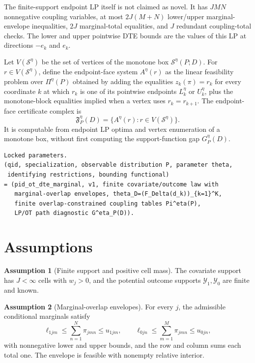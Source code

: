\documentclass[11pt]{article}
\theoremstyle{definition}
\newtheorem{assumption}{Assumption}
\theoremstyle{plain}
\theoremstyle{remark}
\begin{document}
The finite-support endpoint LP itself is not claimed as novel.  It has \(JMN\)
nonnegative coupling variables, at most \(2J(M+N)\) lower/upper marginal-envelope
inequalities, \(2J\) marginal-total equalities, and \(J\) redundant
coupling-total checks.  The lower and upper pointwise DTE bounds are the values
of this LP at directions \(-e_k\) and \(e_k\).

Let \(V(\mathcal S^\eta)\) be the set of vertices of the monotone box
\(\mathcal S^\eta(P;D)\).  For \(r\in V(\mathcal S^\eta)\), define the
endpoint-face system \(A^\eta(r)\) as the linear feasibility problem over
\(\Pi^\eta(P)\) obtained by adding the equalities \(z_k(\pi)=r_k\) for every
coordinate \(k\) at which \(r_k\) is one of its pointwise endpoints
\(L^\eta_k\) or \(U^\eta_k\), plus the monotone-block equalities implied when a
vertex uses \(r_k=r_{k+1}\).  The endpoint-face certificate complex is
\[
\mathfrak F^\eta_P(D)=\{A^\eta(r):r\in V(\mathcal S^\eta)\}.
\]
It is computable from endpoint LP optima and vertex enumeration of a monotone box,
without first computing the support-function gap \(G^\eta_P(D)\).

\begin{verbatim}
Locked parameters.
(qid, specialization, observable distribution P, parameter theta,
 identifying restrictions, bounding functional)
= (pid_ot_dte_marginal, v1, finite covariate/outcome law with
   marginal-overlap envelopes, theta_D=(F_Delta(d_k))_{k=1}^K,
   finite overlap-constrained coupling tables Pi^eta(P),
   LP/OT path diagnostic G^eta_P(D)).
\end{verbatim}

\section{Assumptions}
\begin{assumption}[Finite support and positive cell mass]\label{ass:finite}
The covariate support has \(J<\infty\) cells with \(w_j>0\), and the potential
outcome supports \(\mathcal Y_1,\mathcal Y_0\) are finite and known.
\end{assumption}

\begin{assumption}[Marginal-overlap envelopes]\label{ass:overlap-envelope}
For every \(j\), the admissible conditional marginals satisfy
\[
\ell_{1jm}\le \sum_{n=1}^N\pi_{jmn}\le u_{1jm},\qquad
\ell_{0jn}\le \sum_{m=1}^M\pi_{jmn}\le u_{0jn},
\]
with nonnegative lower and upper bounds, and the row and column sums each total
one.  The envelope is feasible with nonempty relative interior.
\end{assumption}
\end{document}
